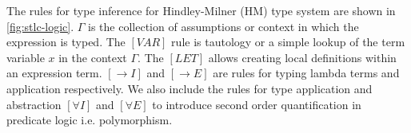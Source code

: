 The rules for type inference for Hindley-Milner (HM) type system are shown in \ref{fig:stlc-logic}. $\Gamma$ is the
collection of assumptions or context in which the expression is typed. The $[VAR]$ rule is tautology or a simple
lookup of the term variable $x$ in the context $\Gamma$. The $[LET]$ allows creating local
definitions within an expression term. $[\rightarrow I]$ and $[\rightarrow E]$ are rules
for typing lambda terms and application respectively. We also include the rules for
type application and abstraction $[\forall I]$ and $[\forall E]$ to introduce second order
quantification in predicate logic i.e. polymorphism.


